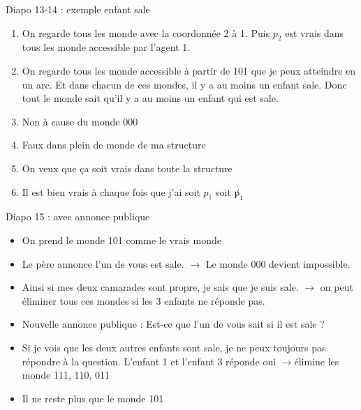 \documentclass{article}
\theoremstyle{plain}%
\theoremstyle{definition}
\theoremstyle{remark}
\begin{document}
Diapo 13-14 : exemple enfant sale
\begin{enumerate}
    \item On regarde tous les monde avec la coordonnée 2 à 1. Puis $ p_2 $ est vrais dans tous les monde accessible par l'agent 1. 
    \item On regarde tous les monde accessible à partir de 101 que je peux atteindre en un arc. Et dans chacun de ces mondes, il y a au moins un enfant sale. Donc tout le monde sait qu'il y a au moins un enfant qui est sale.
    \item Non à cause du monde 000  
    \item Faux dans plein de monde de ma structure
    \item On veux que ça soit vrais dans toute la structure
    \item Il est bien vrais à chaque fois que j'ai soit $ p_1 $ soit $ \not p_1 $ 
\end{enumerate}

Diapo 15 : avec annonce publique
\begin{itemize}
    \item On prend le monde 101 comme le vrais monde
    \item Le père annonce l'un de vous est sale. $\rightarrow$ Le monde 000 devient impossible. \item Ainsi si mes deux camarades sont propre, je sais que je suis sale. $\rightarrow$ on peut éliminer tous ces mondes si les 3 enfants ne réponde pas.
    \item Nouvelle annonce publique : Est-ce que l'un de vous sait si il est sale ?
    \item Si je vois que les deux autres enfants sont sale, je ne peux toujours pas répondre à la question. L'enfant 1 et l'enfant 3 réponde oui $\rightarrow$élimine les monde 111, 110, 011
    \item Il ne reste plus que le monde 101
\end{itemize}
\end{document}
